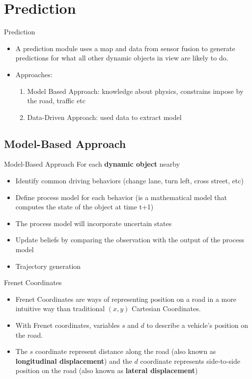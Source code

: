 \documentclass[10pt,mathserif]{beamer}
\begin{document}
\section{Prediction}
\begin{frame}{Prediction}
\begin{itemize}
\item A prediction module uses a map and data from sensor fusion to generate predictions
for what all other dynamic objects in view are likely to do.
\item Approaches:
\begin{enumerate}
\item Model Based Approach: knowledge about physics, constrains impose by the road, traffic etc
\item Data-Driven Approach: used data to extract model
\end{enumerate}
\end{itemize}
\end{frame}

\subsection{Model-Based Approach}
\begin{frame}{Model-Based Approach}
For each \textbf{dynamic object} nearby
\begin{itemize}
\item Identify common driving behaviors (change lane, turn left, cross street, etc)
\item Define process model for each behavior (is a mathematical model that computes the state of the object at time t+1)
\item The process model will incorporate uncertain states
\item Update beliefs by comparing the observation with the output of the process model
\item Trajectory generation
\end{itemize}
\end{frame}

\begin{frame}{Frenet Coordinates}
\begin{itemize}
\item Frenet Coordinates are ways of representing position on a road in a more intuitive way than traditional $(x,y)$ Cartesian Coordinates.
\item With Frenet coordinates, variables $s$ and $d$ to describe a vehicle's position on the road.
\item The $s$ coordinate represent distance along the road (also known as \textbf{longitudinal displacement}) and the $d$ coordinate represents side-to-side position on the road (also known as \textbf{lateral displacement})
\end{itemize}
\end{frame}
\end{document}
